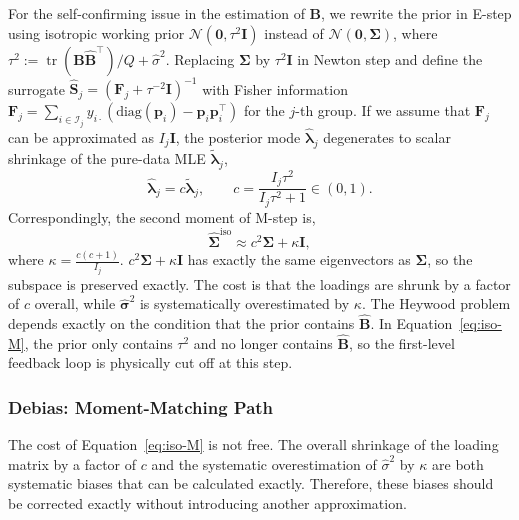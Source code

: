 For the self-confirming issue in the estimation of $\mathbf{B}$, we rewrite the prior in E-step using isotropic working prior $\mathcal{N}\left(\bm{0},\tau^{2}\mathbf{I}\right)$ instead of $\mathcal{N}\left(\mathbf{0},\bm{\Sigma}\right)$, where $\tau^{2}:=\operatorname{tr}\left(\hat{\mathbf{B}}\hat{\mathbf{B}}^{\top}\right)/Q+\hat{\sigma}^{2}$. Replacing $\bm{\Sigma}$ by $\tau^{2}\mathbf{I}$ in Newton step and define the surrogate $\hat{\mathbf{S}}_{j}=\left(\mathbf{F}_{j}+\tau^{-2}\mathbf{I}\right)^{-1}$ with Fisher information $\mathbf{F}_{j}=\sum_{i\in\mathcal{I}_{j}}y_{i\cdot}\left(\text{diag}(\bm{p}_{i})-\bm{p}_{i}\bm{p}_{i}^{\top}\right)$ for the $j$-th group. If we assume that $\mathbf{F}_{j}$ can be approximated as $I_{j}\mathbf{I}$, the posterior mode $\hat{\bm{\lambda}}_{j}$ degenerates to scalar shrinkage of the pure-data MLE $\tilde{\bm{\lambda}}_{j}$,
\begin{equation}
    \hat{\bm{\lambda}}_{j}=c\tilde{\bm{\lambda}}_{j}, \qquad c=\frac{I_{j}\tau^{2}}{I_{j}\tau^{2}+1}\in\left(0,1\right).
    \label{eq:MLE-lam}
\end{equation}
Correspondingly, the second moment of M-step is,
\begin{equation}
    \hat{\bm{\Sigma}}^{\text{iso}}\approx c^{2}\bm{\Sigma}+\kappa\mathbf{I},
    \label{eq:iso-M}
\end{equation}
where $\kappa=\frac{c(c+1)}{I_{j}}$. $c^{2}\bm{\Sigma} + \kappa \mathbf{I}$ has exactly the same eigenvectors as $\bm{\Sigma}$, so the subspace is preserved exactly. The cost is that the loadings are shrunk by a factor of $c$ overall, while $\hat{\bm{\sigma}}^2$ is systematically overestimated by $\kappa$. The Heywood problem depends exactly on the condition that the prior contains $\hat{\mathbf{B}}$. In Equation~\eqref{eq:iso-M}, the prior only contains $\tau^2$ and no longer contains $\hat{\mathbf{B}}$, so the first-level feedback loop is physically cut off at this step.

\subsubsection{Debias: Moment-Matching Path}
\label{subsubsec:debias}

The cost of Equation~\ref{eq:iso-M} is not free. The overall shrinkage of the loading matrix by a factor of $c$ and the systematic overestimation of $\hat{\sigma}^2$ by $\kappa$ are both systematic biases that can be calculated exactly. Therefore, these biases should be corrected exactly without introducing another approximation.

